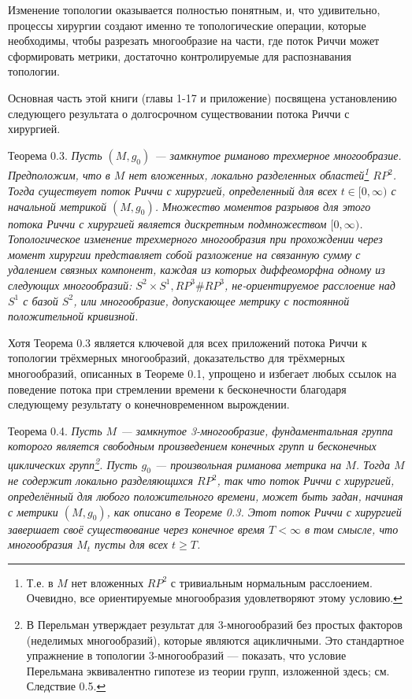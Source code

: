 Изменение топологии оказывается полностью понятным, и, что удивительно, 
процессы хирургии создают именно те топологические операции, которые необходимы, 
чтобы разрезать многообразие на части, где поток Риччи может сформировать 
метрики, достаточно контролируемые для распознавания топологии.

Основная часть этой книги (главы 1-17 и приложение) посвящена установлению 
следующего результата о долгосрочном существовании потока Риччи с хирургией.\vspace{0.5em}

Теорема 0.3. \textit{Пусть $(M, g_{0})$ — замкнутое риманово трехмерное 
многообразие. Предположим, что в $M$ нет вложенных, локально разделенных областей\footnote{Т.е. в $M$ нет вложенных $RP^{2}$ с тривиальным нормальным расслоением. Очевидно, все ориентируемые многообразия удовлетворяют этому условию.} 
$RP^{2}$. Тогда существует поток Риччи с хирургией, 
определенный для всех $t\in [0,\infty)$ с начальной метрикой $(M, g_{0})$. 
Множество моментов разрывов для этого потока Риччи с хирургией является 
дискретным подмножеством $[0,\infty)$.
Топологическое изменение трехмерного многообразия при прохождении через 
момент хирургии представляет собой разложение на связанную сумму с 
удалением связных компонент, каждая из которых диффеоморфна одному из 
следующих многообразий: $S^{2}\times S^{1}, RP^{3} \# RP^{3}$, не-ориентируемое 
расслоение над $S^{1}$ с базой $S^{2}$, или многообразие, допускающее 
метрику с постоянной положительной кривизной.}\vspace{0.5em}

Хотя Теорема 0.3 является ключевой для всех приложений потока Риччи к 
топологии трёхмерных многообразий, доказательство для трёхмерных многообразий, 
описанных в Теореме 0.1, упрощено и избегает любых ссылок на поведение потока 
при стремлении времени к бесконечности благодаря следующему результату о 
конечновременном вырождении.\vspace{0.5em}

Теорема 0.4. \textit{Пусть $M$ — замкнутое 3-многообразие, фундаментальная группа которого 
является свободным произведением конечных групп и бесконечных циклических групп\footnote{В \cite{c54} Перельман утверждает результат для 3-многообразий без простых факторов (неделимых многообразий), которые являются ацикличными. Это стандартное упражнение в топологии 3-многообразий — показать, что условие Перельмана эквивалентно гипотезе из теории групп, изложенной здесь; см. Следствие 0.5.}. 
Пусть $g_{0}$ — произвольная риманова метрика на $M$. Тогда $M$ не содержит локально 
разделяющихся $RP^{2}$, так что поток Риччи с хирургией, определённый для любого 
положительного времени, может быть задан, начиная с метрики $(M,g_{0})$, как описано 
в Теореме 0.3. Этот поток Риччи с хирургией завершает своё существование через 
конечное время $T<\infty$ в том смысле, что многообразия $M_{t}$ пусты для всех $t \geq T$.}\vspace{0.5em}


